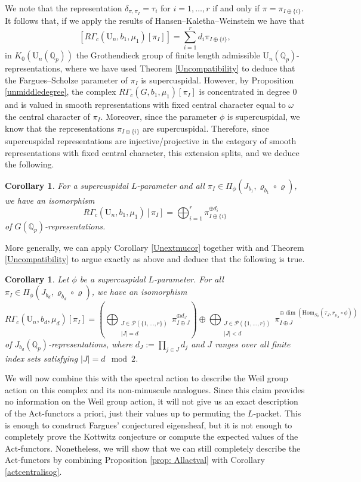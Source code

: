 \documentclass[reqno,11pt]{amsart}
\newtheorem{corollary}[theorem]{Corollary}
\theoremstyle{remark}
\newcommand{\U}{\mathrm{U}}
\newcommand{\mc}{\mathcal}
\newcommand{\Act}{\mathrm{Act}}
\begin{document}
We note that the representation $\delta_{\pi,\pi_{I}} = \tau_{i}$ for $i = 1,\ldots,r$ if and only if $\pi = \pi_{I \oplus \{i\}}$. It follows that, if we apply the results of Hansen--Kaletha--Weinstein \cite[Theorem~1.0.2]{HKW} we have that 
\[ [R\Gamma_{c}(\U_n,b_1,\mu_{1})[\pi_{I}]] = \sum_{i = 1}^{r} d_{i}\pi_{I \oplus \{i\}},  \]
in $K_{0}(\U_n(\mathbb{Q}_{p}))$ the Grothendieck group of finite length admissible $\U_n(\mathbb{Q}_{p})$-representations, where we have used Theorem \ref{Uncompatibility} to deduce that the Fargues--Scholze parameter of $\pi_{I}$ is supercuspidal. However, by Proposition \ref{unmiddledegree}, the complex  $R\Gamma_{c}(G,b_1,\mu_{1})[\pi_{I}]$ is concentrated in degree $0$ and is valued in smooth representations with fixed central character equal to $\omega$ the central character of $\pi_{I}$. Moreover, since the parameter $\phi$ is supercuspidal, we know that the representations $\pi_{I \oplus \{i\}}$ are supercuspidal. Therefore, since supercuspidal representations are injective/projective in the category of smooth representations with fixed central character, this extension splits, and we deduce the following. 
\begin{corollary}{\label{UnGdescr}}
For a supercuspidal $L$-parameter and all $\pi_{I} \in \Pi_{\phi}(J_{b_1}, \varrho_{b_1} \circ \varrho)$, we have an isomorphism 
\[ R\Gamma_{c}(\U_n,b_1,\mu_{1})[\pi_{I}] = \bigoplus_{i = 1}^{r} \pi_{I \oplus \{i\}}^{\oplus d_{i}} \]
of $G(\mathbb{Q}_{p})$-representations.
\end{corollary}
More generally, we can apply Corollary \ref{Unextmucor} together with \cite[Theorem~1.0.2]{HKW} and Theorem \ref{Uncompatibility} to argue exactly as above and deduce that the following is true.  
\begin{corollary}{\label{UnGdescr}}
Let $\phi$ be a supercuspidal $L$-parameter. For all $\pi_{I} \in \Pi_{\phi}(J_{b_{d}}, \varrho_{b_d} \circ \varrho)$, we have an isomorphism 
\[ R\Gamma_{c}(\U_n,b_{d},\mu_{d})[\pi_{I}] = (\bigoplus_{\substack{J \in \mc{P}(\{1,\ldots,r\}) \\ |J| = d}} \pi_{I \oplus J}^{\oplus d_{J}}) \oplus \bigoplus_{\substack{J \in \mc{P}(\{1,\ldots,r\}) \\ |J| < d}} \pi_{I \oplus J}^{\oplus \dim(\mathrm{Hom}_{S_{\phi}}(\tau_{J},r_{\mu_{d}} \circ \phi))}  \] 
of $J_{b_{d}}(\mathbb{Q}_{p})$-representations, where $d_{J} := \prod_{j \in J} d_{j}$ and $J$ ranges over all finite index sets satisfying $|J| = d \mod 2$. 
\end{corollary}
We will now combine this with the spectral action to describe the Weil group action on this complex and its non-minuscule analogues. Since this claim provides no information on the Weil group action, it will not give us an exact description of the $\Act$-functors a priori, just their values up to permuting the $L$-packet. This is enough to construct Fargues' conjectured eigensheaf, but it is not enough to completely prove the Kottwitz conjecture or compute the expected values of the $\Act$-functors. Nonetheless, we will show that we can still completely describe the $\Act$-functors by combining Proposition \ref{prop: Allactval} with Corollary \ref{actcentralisog}.
\end{document}
